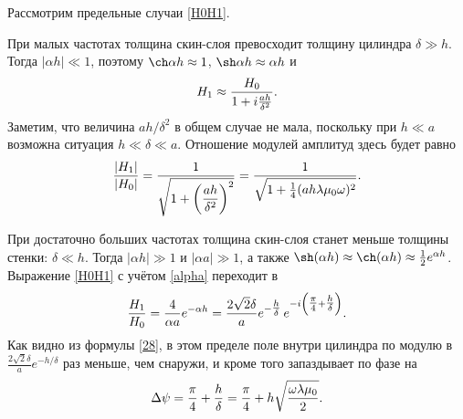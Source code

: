 
Рассмотрим предельные случаи \eqref{H0H1}.

При малых частотах толщина скин-слоя превосходит толщину цилиндра 
$\delta \gg h$. Тогда $|\alpha h| \ll 1$, 
поэтому $\ch \alpha h \approx 1$, $\sh \alpha h\approx \alpha h$ и
\begin{equation}\eqmark{H1}
H_1 \approx \frac{H_0}{1 + i \frac{a h}{\delta ^2}}.
\end{equation}
Заметим, что величина $ah/\delta^2$ в общем случае не мала, поскольку 
при $h\ll a$ возможна ситуация $h\ll \delta \ll a$.
Отношение модулей амплитуд здесь будет равно
\begin{equation} \eqmark{27}
\frac{|H_1|}{|H_0|} = \frac{1}{\sqrt{1+\left(\dfrac{ah}{\delta^2}\right)^2}} = 
\frac{1}{\sqrt{1+\frac14 (ah \lambda \mu_0 \omega)^2}}.
\end{equation}

При достаточно больших частотах толщина скин-слоя станет меньше толщины стенки:
$\delta \ll h$. Тогда $|\alpha h| \gg 1$ и $|\alpha a| \gg 1$, а
также $\sh(\alpha h)\approx\ch(\alpha h)\approx\frac12e^{\alpha h}$. 
Выражение \eqref{H0H1} с учётом \eqref{alpha} переходит в
\begin{equation} \eqmark{28}
\frac{H_1}{H_0}= \frac{4}{\alpha a} e^{-\alpha h} 
= \frac{2\sqrt{2}\delta}{a}e^{-\tfrac{h}{\delta}}\,e^{-i\left(\tfrac{\pi}{4}+\tfrac{h}{\delta}\right)}.
\end{equation}
Как видно из формулы \eqref{28}, в этом пределе поле внутри цилиндра по модулю в
$\frac{2\sqrt{2}\delta}{a}e^{-h/\delta}$ раз меньше, чем снаружи, и 
кроме того запаздывает по фазе на
\begin{equation} \eqmark{29}
\Delta\psi=\frac{\pi}{4}+\frac{h}{\delta}=
\frac{\pi}{4}+h\sqrt{\frac{\omega\lambda\mu_0}{2}}.
\end{equation}


